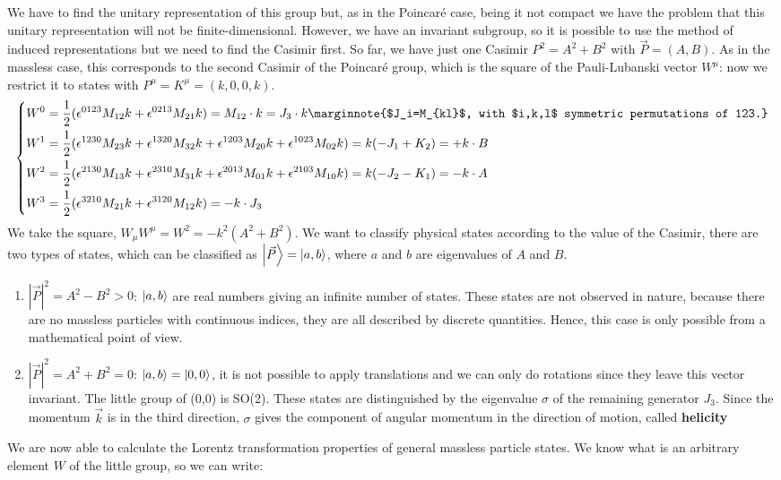 \documentclass[../main.tex]{subfiles}
\begin{document}
We have to find the unitary representation of this group but, as in the Poincaré case, being it not compact we have the problem that this unitary representation will not be finite-dimensional. However, we have an invariant subgroup, so it is possible to use the method of induced representations but we need to find the Casimir first. So far, we have just one Casimir $P^2=A^2+B^2$ with $\vec{P}=(A,B)$. As in the massless case, this corresponds to the second Casimir of the Poincaré group, which is the square of the Pauli-Lubanski vector $W^\mu$: now we restrict it to states with $P^\mu=K^\mu=(k,0,0,k)$.
\[
\left\{
\begin{aligned}
&W^0=\frac{1}{2}(\epsilon^{0123}M_{12}k+\epsilon^{0213}M_{21}k)=M_{12}\cdot k=J_3\cdot k\marginnote{$J_i=M_{kl}$, with $i,k,l$ symmetric permutations of 123.}\\
&W^1=\frac{1}{2}(\epsilon^{1230}M_{23}k+\epsilon^{1320}M_{32}k+\epsilon^{1203}M_{20}k+\epsilon^{1023}M_{02}k)=k(-J_1+K_2)=+k\cdot B\\
&W^2=\frac{1}{2}(\epsilon^{2130}M_{13}k+\epsilon^{2310}M_{31}k+\epsilon^{2013}M_{01}k+\epsilon^{2103}M_{10}k)=k(-J_2-K_1)=-k\cdot A\\
&W^3=\frac{1}{2}(\epsilon^{3210}M_{21}k+\epsilon^{3120}M_{12}k)=-k\cdot J_3
\end{aligned}
\right.
\]
We take the square, $W_\mu W^\mu=W^2=-k^2(A^2+B^2)$. We want to classify physical states according to the value of the Casimir, there are two types of states, which can be classified as $\ket{\Vec{P}}=\ket{a,b}$, where $a$ and $b$ are eigenvalues of $A$ and $B$.
\begin{enumerate}
    \item $|\vec{P}|^2=A^2-B^2>0$: $\ket{a,b}$ are real numbers giving an infinite number of states. These states are not observed in nature, because there are no massless particles with continuous indices, they are all described by discrete quantities. Hence, this case is only possible from a mathematical point of view.
    \item $|\vec{P}|^2=A^2+B^2=0$: $\ket{a,b}=\ket{0,0}$, it is not possible to apply translations and we can only do rotations since they leave this vector invariant. The little group of (0,0) is SO(2). These states are distinguished by the eigenvalue $\sigma$ of the remaining generator $J_3$. Since the momentum $\Vec{k}$ is in the third direction, $\sigma$ gives the component of angular momentum in the direction of motion, called \textbf{helicity}
\end{enumerate}
We are now able to calculate the Lorentz transformation properties of general massless particle states. We know what is an arbitrary element  $W$ of the little group, so we can write:
\end{document}
